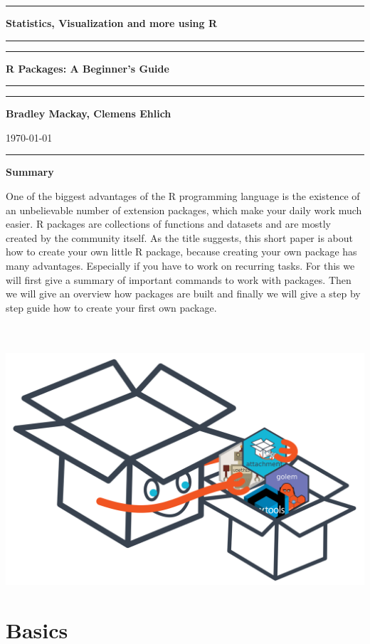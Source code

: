 \documentclass[a4paper,11pt]{article}
\begin{document}
\hrule
\begin{center}
\Large{\textbf{Statistics, Visualization and more using R}} \\[3mm]
\hrule
\hrule 
\vspace{2mm}
\LARGE{\textbf{R Packages: A Beginner's Guide }} \\[2mm] 
\hrule
\hrule
\vspace{6mm}
\large{ \textbf{Bradley Mackay, Clemens Ehlich}	
}\\[5mm]

\end{center}
\begin{center}
\today
\end{center}
\hrule
\vspace{3cm}


\begin{center}
\large{\textbf{Summary}}
\end{center}
One of the biggest advantages of the R programming language is the existence of an unbelievable number of extension packages, which make your daily work much easier. R packages are collections of functions and datasets and are mostly created by the community itself. As the title suggests, this short paper is about how to create your own little R package, because creating your own package has many advantages. Especially if you have to work on recurring tasks. For this we will first give a summary of important commands to work with packages. Then we will give an overview how packages are built and finally we will give a step by step guide how to create your first own package.
\\
\\
\\
\begin{center}
	\includegraphics[width=0.6\linewidth]{pack}
\end{center}  

\tableofcontents
\vspace*{2cm}
\clearpage

\section{Basics}
\end{document}
